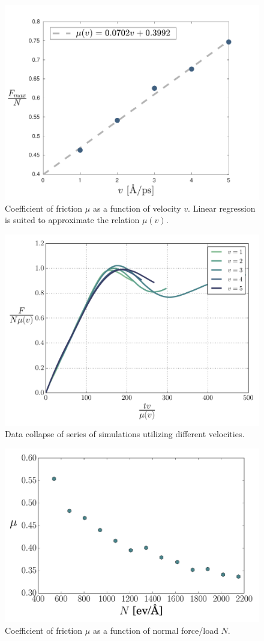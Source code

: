 \documentclass[twoside,english]{uiofysmaster}
\begin{document}
\begin{figure}[H]
\centering
\includegraphics[width=0.7\linewidth]{figures/friction/scalingCoeffisient/u(v)}
\caption{Coefficient of friction $\mu$ as a function of velocity $v$. 
	Linear regression is suited to approximate the relation $\mu(v)$.}
\label{fig:springUvsV}
\end{figure}
\vfill
\begin{figure}[H]
\centering
\includegraphics[width=0.7\linewidth]{figures/friction/scalingCoeffisient/dataCollapse}
\caption{Data collapse of series of simulations utilizing different velocities.}
\label{fig:springDataCollapse}
\end{figure}



\begin{figure}[H]
	\centering
	\includegraphics[width=0.7\linewidth]{figures/friction/scalingCoeffisient/UvsN2}
	\caption{Coefficient of friction $\mu$ as a function of normal force/load $N$.}
	\label{fig:uvsn}
\end{figure}
\end{document}
